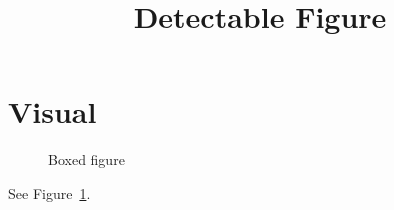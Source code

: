 \documentclass[letterpaper]{article}
\begin{document}
\title{Detectable Figure}\author{}\date{}\maketitle
\section{Visual}
\begin{figure}[h]
\centering{}
\caption{Boxed figure}\label{fig:one}
\end{figure}
See Figure~\ref{fig:one}.
\end{document}
